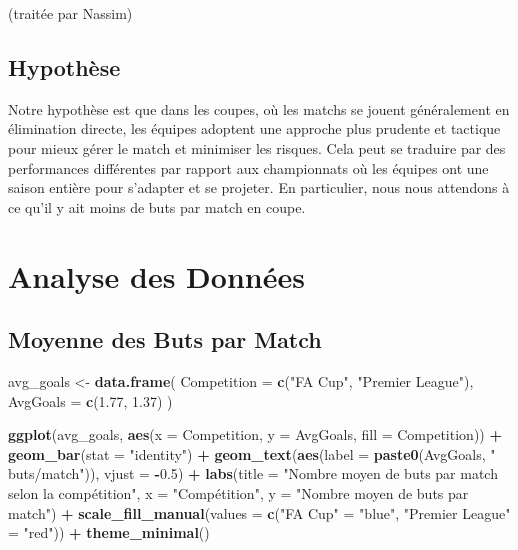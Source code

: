 \documentclass[
]{article}
\newenvironment{Shaded}{\begin{snugshade}}{\end{snugshade}}
\newcommand{\AttributeTok}[1]{\textcolor[rgb]{0.13,0.29,0.53}{#1}}
\newcommand{\FloatTok}[1]{\textcolor[rgb]{0.00,0.00,0.81}{#1}}
\newcommand{\FunctionTok}[1]{\textcolor[rgb]{0.13,0.29,0.53}{\textbf{#1}}}
\newcommand{\NormalTok}[1]{#1}
\newcommand{\OtherTok}[1]{\textcolor[rgb]{0.56,0.35,0.01}{#1}}
\newcommand{\SpecialCharTok}[1]{\textcolor[rgb]{0.81,0.36,0.00}{\textbf{#1}}}
\newcommand{\StringTok}[1]{\textcolor[rgb]{0.31,0.60,0.02}{#1}}
\begin{document}
(traitée par Nassim)

\subsection{Hypothèse}\label{hypothuxe8se}

Notre hypothèse est que dans les coupes, où les matchs se jouent
généralement en élimination directe, les équipes adoptent une approche
plus prudente et tactique pour mieux gérer le match et minimiser les
risques. Cela peut se traduire par des performances différentes par
rapport aux championnats où les équipes ont une saison entière pour
s'adapter et se projeter. En particulier, nous nous attendons à ce qu'il
y ait moins de buts par match en coupe.

\section{Analyse des Données}\label{analyse-des-donnuxe9es}

\subsection{Moyenne des Buts par
Match}\label{moyenne-des-buts-par-match}

\begin{Shaded}
\begin{Highlighting}[]
\NormalTok{avg\_goals }\OtherTok{\textless{}{-}} \FunctionTok{data.frame}\NormalTok{(}
  \AttributeTok{Competition =} \FunctionTok{c}\NormalTok{(}\StringTok{"FA Cup"}\NormalTok{, }\StringTok{"Premier League"}\NormalTok{),}
  \AttributeTok{AvgGoals =} \FunctionTok{c}\NormalTok{(}\FloatTok{1.77}\NormalTok{, }\FloatTok{1.37}\NormalTok{)}
\NormalTok{)}

\FunctionTok{ggplot}\NormalTok{(avg\_goals, }\FunctionTok{aes}\NormalTok{(}\AttributeTok{x =}\NormalTok{ Competition, }\AttributeTok{y =}\NormalTok{ AvgGoals, }\AttributeTok{fill =}\NormalTok{ Competition)) }\SpecialCharTok{+}
  \FunctionTok{geom\_bar}\NormalTok{(}\AttributeTok{stat =} \StringTok{"identity"}\NormalTok{) }\SpecialCharTok{+}
  \FunctionTok{geom\_text}\NormalTok{(}\FunctionTok{aes}\NormalTok{(}\AttributeTok{label =} \FunctionTok{paste0}\NormalTok{(AvgGoals, }\StringTok{" buts/match"}\NormalTok{)), }\AttributeTok{vjust =} \SpecialCharTok{{-}}\FloatTok{0.5}\NormalTok{) }\SpecialCharTok{+}
  \FunctionTok{labs}\NormalTok{(}\AttributeTok{title =} \StringTok{"Nombre moyen de buts par match selon la compétition"}\NormalTok{,}
       \AttributeTok{x =} \StringTok{"Compétition"}\NormalTok{, }\AttributeTok{y =} \StringTok{"Nombre moyen de buts par match"}\NormalTok{) }\SpecialCharTok{+}
  \FunctionTok{scale\_fill\_manual}\NormalTok{(}\AttributeTok{values =} \FunctionTok{c}\NormalTok{(}\StringTok{"FA Cup"} \OtherTok{=} \StringTok{"blue"}\NormalTok{, }\StringTok{"Premier League"} \OtherTok{=} \StringTok{"red"}\NormalTok{)) }\SpecialCharTok{+}
  \FunctionTok{theme\_minimal}\NormalTok{()}
\end{Highlighting}
\end{Shaded}
\end{document}
